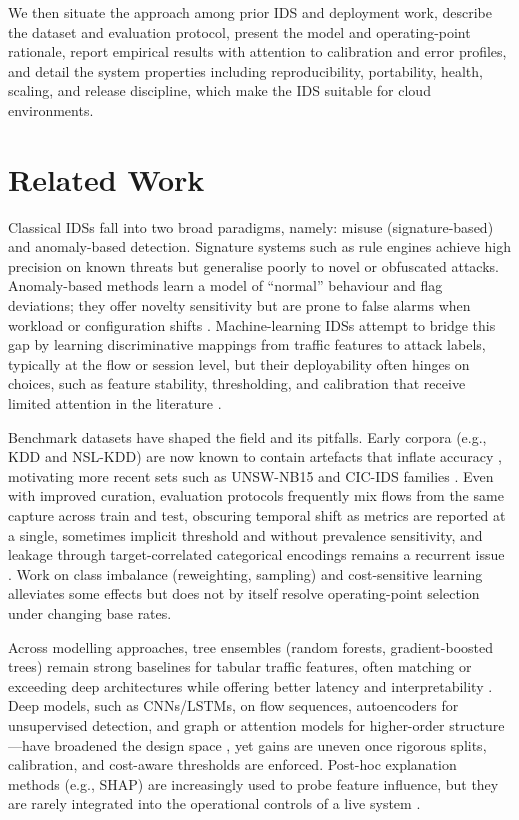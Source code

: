\documentclass{article}
\begin{document}
We then situate the approach among prior IDS and deployment work, describe the dataset and evaluation protocol, present the model and operating-point rationale, report empirical results with attention to calibration and error profiles, and detail the system properties including reproducibility, portability, health, scaling, and release discipline, which make the IDS suitable for cloud environments.

\section{Related Work}
Classical IDSs fall into two broad paradigms, namely: misuse (signature-based) and anomaly-based detection. Signature systems such as rule engines achieve high precision on known threats but generalise poorly to novel or obfuscated attacks. Anomaly-based methods learn a model of “normal” behaviour and flag deviations; they offer novelty sensitivity but are prone to false alarms when workload or configuration shifts \cite{wong2007}. Machine-learning IDSs attempt to bridge this gap by learning discriminative mappings from traffic features to attack labels, typically at the flow or session level, but their deployability often hinges on choices, such as feature stability, thresholding, and calibration that receive limited attention in the literature \cite{bhardwaj2013, subbulakshmi2009}.

Benchmark datasets have shaped the field and its pitfalls. Early corpora (e.g., KDD and NSL-KDD) are now known to contain artefacts that inflate accuracy \cite{silva2020}, motivating more recent sets such as UNSW-NB15 and CIC-IDS families \cite{abdulraheem2019, sharafaldin2018}. Even with improved curation, evaluation protocols frequently mix flows from the same capture across train and test, obscuring temporal shift as metrics are reported at a single, sometimes implicit threshold and without prevalence sensitivity, and leakage through target-correlated categorical encodings remains a recurrent issue \cite{viegas2017}. Work on class imbalance (reweighting, sampling) and cost-sensitive learning alleviates some effects but does not by itself resolve operating-point selection under changing base rates.

Across modelling approaches, tree ensembles (random forests, gradient-boosted trees) remain strong baselines for tabular traffic features, often matching or exceeding deep architectures while offering better latency and interpretability \cite{abedin2018}. Deep models, such as CNNs/LSTMs, on flow sequences, autoencoders for unsupervised detection, and graph or attention models for higher-order structure—have broadened the design space \cite{clausen2020, glavan2023}, yet gains are uneven once rigorous splits, calibration, and cost-aware thresholds are enforced. Post-hoc explanation methods (e.g., SHAP) are increasingly used to probe feature influence, but they are rarely integrated into the operational controls of a live system \cite{spadari2024}.
\end{document}
